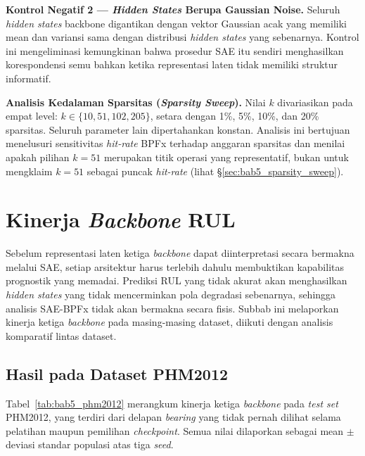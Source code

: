 \textbf{Kontrol Negatif 2 --- \emph{Hidden States} Berupa Gaussian Noise.}
Seluruh \emph{hidden states} backbone digantikan dengan vektor Gaussian acak
yang memiliki mean dan variansi sama dengan distribusi \emph{hidden states}
yang sebenarnya.
Kontrol ini mengeliminasi kemungkinan bahwa prosedur SAE itu sendiri menghasilkan
korespondensi semu bahkan ketika representasi laten tidak memiliki struktur
informatif.

\textbf{Analisis Kedalaman Sparsitas (\emph{Sparsity Sweep}).} Nilai $k$
divariasikan pada empat level: $k \in \{10, 51, 102, 205\}$, setara dengan
1\%, 5\%, 10\%, dan 20\% sparsitas.
Seluruh parameter lain dipertahankan konstan.
{\color{blue}Analisis ini bertujuan menelusuri sensitivitas
\emph{hit-rate} BPFx terhadap anggaran sparsitas dan menilai apakah pilihan
$k = 51$ merupakan titik operasi yang representatif, bukan untuk mengklaim
$k = 51$ sebagai puncak \emph{hit-rate} (lihat \S\ref{sec:bab5_sparsity_sweep}).}

\section{Kinerja \emph{Backbone} RUL}
\label{sec:bab5_kinerja_rul}

Sebelum representasi laten ketiga \emph{backbone} dapat diinterpretasi
secara bermakna melalui SAE, setiap arsitektur harus terlebih dahulu
membuktikan kapabilitas prognostik yang memadai.
Prediksi RUL yang tidak akurat akan menghasilkan \emph{hidden states}
yang tidak mencerminkan pola degradasi sebenarnya, sehingga analisis
SAE-BPFx tidak akan bermakna secara fisis.
Subbab ini melaporkan kinerja ketiga \emph{backbone} pada masing-masing
dataset, diikuti dengan analisis komparatif lintas dataset.

\subsection{Hasil pada Dataset PHM2012}
\label{subsec:bab5_phm2012_rul}

Tabel~\ref{tab:bab5_phm2012} merangkum kinerja ketiga \emph{backbone}
pada \emph{test set} PHM2012, yang terdiri dari delapan \emph{bearing} yang tidak
pernah dilihat selama pelatihan maupun pemilihan \emph{checkpoint}.
Semua nilai dilaporkan sebagai mean $\pm$ deviasi standar populasi atas
tiga \emph{seed}.

